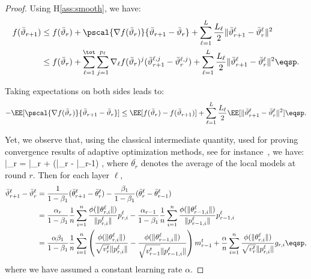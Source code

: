 \documentclass[11pt]{article}
\begin{document}

\begin{proof}
Using H\ref{ass:smooth}, we have:
\begin{align}\notag
f(\bar{\vartheta}_{r+1}) &  \leq f(\bar{\vartheta}_r) + \pscal{\nabla f(\bar{\vartheta}_r)}{\bar{\vartheta}_{r+1} - \bar{\vartheta}_r} + \sum_{\ell =1}^L \frac{L_\ell}{2} \| \bar{\vartheta}^\ell_{r+1} - \bar{\vartheta}^\ell_r \|^2\\\notag
&  \leq f(\bar{\vartheta}_r) + \sum_{\ell=1}^\tot \sum_{j=1}^{p_\ell} \nabla_{\ell} f(\bar{\vartheta}_r)^j (\bar{\vartheta}^{\ell,j}_{r+1} - \bar{\vartheta}^{\ell,j}_r) + \sum_{\ell =1}^L \frac{L_\ell}{2} \| \bar{\vartheta}^\ell_{r+1} - \bar{\vartheta}^\ell_r \|^2  \eqsp.
\end{align}

Taking expectations on both sides leads to:
\begin{align}\label{eq:main}
- \EE[  \pscal{\nabla f(\bar{\vartheta}_r)}{\bar{\vartheta}_{r+1} - \bar{\vartheta}_r}]  \leq  \EE[ f(\bar{\vartheta}_r) - f(\bar{\vartheta}_{r+1})] + \sum_{\ell =1}^L \frac{L_\ell}{2} \EE[  \| \bar{\vartheta}^\ell_{r+1} - \bar{\vartheta}^\ell_r \|^2] \eqsp.
\end{align}

Yet, we observe that, using the classical intermediate quantity, used for proving convergence results of adaptive optimization methods, see for instance~\citep{RKK18}, we have:
\beq\label{eq:defseq}
\bar{\vartheta}_r = \bar{\theta}_r +  (\bar{\theta}_{r} - \bar{\theta}_{r-1}) \eqsp,
\eeq
where $\bar{\theta_r}$ denotes the average of the local models at round $r$.
Then for each layer $\ell$,
\begin{align}\label{eq:gap}
\bar{\vartheta}^\ell_{r+1} - \bar{\vartheta}^\ell_r  & = \frac{1}{1-\beta_1}(\bar{\theta}^\ell_{r+1} - \bar{\theta}^\ell_{r}) - \frac{\beta_1}{1-\beta_1}(\bar{\theta}^\ell_{r} - \bar{\theta}^\ell_{r-1})\\
& = \frac{\alpha_{r}}{1-\beta_1} \frac{1}{n} \sum_{i = 1}^n \frac{\phi(\|\theta_{r,i}^{\ell}\|)}{\|p_{r,i}^{\ell}\|} p_{r,i}^{\ell}  - \frac{\alpha_{r-1}}{1-\beta_1} \frac{1}{n} \sum_{i = 1}^n \frac{\phi(\|\theta_{r-1,i}^{\ell}\|)}{\|p_{r-1,i}^{\ell}\|} p_{r-1,i}^{\ell}\\
& = \frac{\alpha \beta_1}{1-\beta_1} \frac{1}{n}  \sum_{i = 1}^n  \left( \frac{\phi(\|\theta_{r,i}^{\ell}\|)}{\sqrt{v^{t}_{r}} \|p_{r,i}^{\ell}\|} - \frac{\phi(\|\theta_{r-1,i}^{\ell}\|)}{\sqrt{v^{t}_{r-1}} \|p_{r-1,i}^{\ell}\|} \right) m^{t}_{r-1} + \frac{\alpha}{n} \sum_{i = 1}^n \frac{\phi(\|\theta_{r,i}^{\ell}\|)}{\sqrt{v^{t}_{r}} \|p_{r,i}^{\ell}\|} g_{r,i} \eqsp,
\end{align}
where we have assumed a constant learning rate $\alpha$.



\end{proof}
\end{document}
